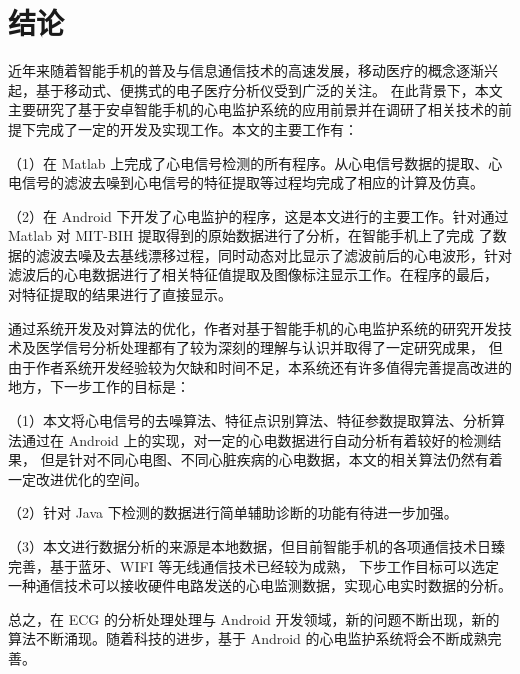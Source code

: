 \chapter{结论}
近年来随着智能手机的普及与信息通信技术的高速发展，移动医疗的概念逐渐兴起，基于移动式、便携式的电子医疗分析仪受到广泛的关注。
在此背景下，本文主要研究了基于安卓智能手机的心电监护系统的应用前景并在调研了相关技术的前提下完成了一定的开发及实现工作。本文的主要工作有： 

（1）在 Matlab 上完成了心电信号检测的所有程序。从心电信号数据的提取、心电信号的滤波去噪到心电信号的特征提取等过程均完成了相应的计算及仿真。 

（2）在 Android 下开发了心电监护的程序，这是本文进行的主要工作。针对通过 Matlab 对 MIT-BIH 提取得到的原始数据进行了分析，在智能手机上了完成
了数据的滤波去噪及去基线漂移过程，同时动态对比显示了滤波前后的心电波形，针对滤波后的心电数据进行了相关特征值提取及图像标注显示工作。在程序的最后，
对特征提取的结果进行了直接显示。 

通过系统开发及对算法的优化，作者对基于智能手机的心电监护系统的研究开发技术及医学信号分析处理都有了较为深刻的理解与认识并取得了一定研究成果，
但由于作者系统开发经验较为欠缺和时间不足，本系统还有许多值得完善提高改进的地方，下一步工作的目标是： 

（1）本文将心电信号的去噪算法、特征点识别算法、特征参数提取算法、分析算法通过在 Android 上的实现，对一定的心电数据进行自动分析有着较好的检测结果，
但是针对不同心电图、不同心脏疾病的心电数据，本文的相关算法仍然有着一定改进优化的空间。 

（2）针对 Java 下检测的数据进行简单辅助诊断的功能有待进一步加强。 

（3）本文进行数据分析的来源是本地数据，但目前智能手机的各项通信技术日臻完善，基于蓝牙、WIFI 等无线通信技术已经较为成熟，
下步工作目标可以选定一种通信技术可以接收硬件电路发送的心电监测数据，实现心电实时数据的分析。 

总之，在 ECG 的分析处理处理与 Android 开发领域，新的问题不断出现，新的算法不断涌现。随着科技的进步，基于 Android 的心电监护系统将会不断成熟完善。 
